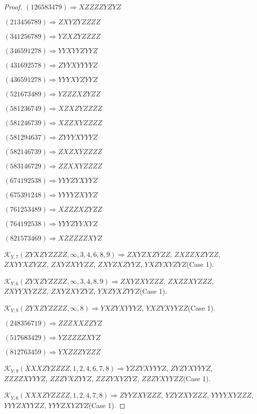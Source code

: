 \documentclass[12pt]{article}
\theoremstyle{plain}
\theoremstyle{definition}
\theoremstyle{remark}
\newcommand{\fancy}[1]{\mathcal{#1}}
\def\K{\fancy{K}}
\begin{document}
\begin{proof}
	$(1 2 6 5 8 3 4 7 9)\Rightarrow XZZZZYZYZ$
	
	$(2 1 3 4 5 6 7 8 9)\Rightarrow ZXYZYZZZZ$
	
	$(3 4 1 2 5 6 7 8 9)\Rightarrow YZXZYZZZZ$
	
	$(3 4 6 5 9 1 2 7 8)\Rightarrow YYXYYZYYZ$
	
	$(4 3 1 6 9 2 5 7 8)\Rightarrow ZYYXYYYYZ$
	
	$(4 3 6 5 9 1 2 7 8)\Rightarrow YYYXYZYYZ$
	
	$(5 2 1 6 7 3 4 8 9)\Rightarrow YZZZXZYZZ$
	
	$(5 8 1 2 3 6 7 4 9)\Rightarrow XZXZYZZZZ$
	
	$(5 8 1 2 4 6 7 3 9)\Rightarrow XZZXYZZZZ$
	
	$(5 8 1 2 9 4 6 3 7)\Rightarrow ZYYYXYYYZ$
	
	$(5 8 2 1 4 6 7 3 9)\Rightarrow ZXZXYZZZZ$
	
	$(5 8 3 1 4 6 7 2 9)\Rightarrow ZZXXYZZZZ$
	
	$(6 7 4 1 9 2 5 3 8)\Rightarrow YYYZYXYYZ$
	
	$(6 7 5 3 9 1 2 4 8)\Rightarrow YYYYZXYYZ$
	
	$(7 6 1 2 5 3 4 8 9)\Rightarrow XZZZXZYZZ$
	
	$(7 6 4 1 9 2 5 3 8)\Rightarrow YYYZYYXYZ$
	
	$(8 2 1 5 7 3 4 6 9)\Rightarrow XZZZZZXYZ$
	
	
	
	$\K_{Y,7}(ZYXZYZZZZ,\infty,3, 4, 6, 8, 9)\Rightarrow $$ZXYZXZYZZ$, $ZXZZXZYZZ$, $ZXYYXZYZZ$, $ZXYZXYYZZ$, $ZXYZXZYYZ$, $YXZYXYZYZ$(Case 1).
	
	$\K_{Y,6}(ZYXZYZZZZ,\infty,3, 4, 8, 9)\Rightarrow $$ZXYZXYZZZ$, $ZXZZXYZZZ$, $ZXYYXYZZZ$, $ZXYZXYZYZ$, $YXZYXZYYZ$(Case 1).
	
	$\K_{Y,9}(ZYXZYZZZZ,\infty,8)\Rightarrow $$YXZYXYYYZ$, $YXZYXYYZZ$(Case 1).
	
	
	
	$(2 4 8 3 5 6 7 1 9)\Rightarrow ZZZXXZZYZ$
	
	$(5 1 7 6 8 3 4 2 9)\Rightarrow YZZZZZXYZ$
	
	$(8 1 2 7 6 3 4 5 9)\Rightarrow YXZZZYZZZ$
	
	
	
	$\K_{Y,9}(XXXZYZZZZ,1, 2, 4, 6, 7, 8)\Rightarrow $$YZZYXYYYZ$, $ZYZYXYYYZ$, $ZZZZXYYYZ$, $ZZZYXZYYZ$, $ZZZYXYZYZ$, $ZZZYXYYZZ$(Case 1).
	
	$\K_{Y,6}(XXXZYZZZZ,1, 2, 4, 7, 8)\Rightarrow $$ZYYZXYZZZ$, $YZYZXYZZZ$, $YYYYXYZZZ$, $YYYZXYYZZ$, $YYYZXYZYZ$(Case 1).
	

\end{proof}
\end{document}

